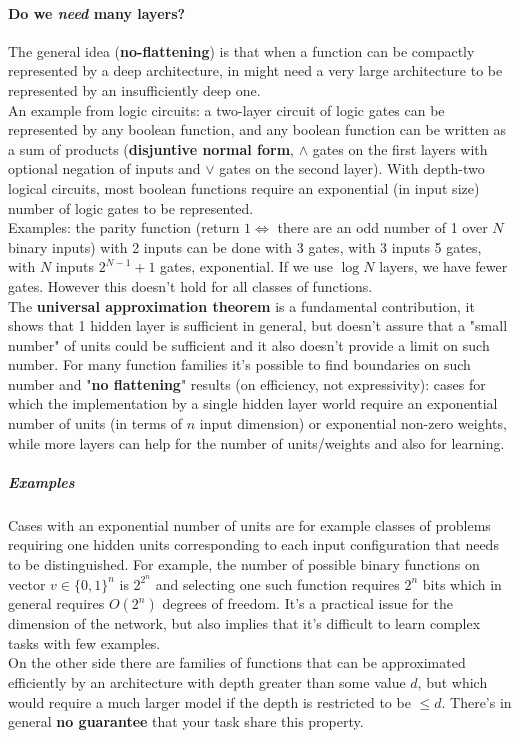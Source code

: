 \documentclass[10pt]{report}
\begin{document}
\paragraph{Do we \textit{need} many layers?} The general idea (\textbf{no-flattening}) is that when a function can be compactly represented by a deep architecture, in might need a very large architecture to be represented by an insufficiently deep one.\\
An example from logic circuits: a two-layer circuit of logic gates can be represented by any boolean function, and any boolean function can be written as a sum of products (\textbf{disjuntive normal form}, $\wedge$ gates on the first layers with optional negation of inputs and $\vee$ gates on the second layer). With depth-two logical circuits, most boolean functions require an exponential (in input size) number of logic gates to be represented.\\
Examples: the parity function (return $1\Leftrightarrow$ there are an odd number of 1 over $N$ binary inputs) with 2 inputs can be done with 3 gates, with 3 inputs 5 gates, with $N$ inputs $2^{N-1}+1$ gates, exponential. If we use $\log N$ layers, we have fewer gates. However this doesn't hold for all classes of functions.\\
The \textbf{universal approximation theorem} is a fundamental contribution, it shows that 1 hidden layer is sufficient in general, but doesn't assure that a "small number" of units could be sufficient and it also doesn't provide a limit on such number. For many function families it's possible to find boundaries on such number and "\textbf{no flattening}" results (on efficiency, not expressivity): cases for which the implementation by a single hidden layer world require an exponential number of units (in terms of $n$ input dimension) or exponential non-zero weights, while more layers can help for the number of units/weights and also for learning.
\subparagraph{Examples} Cases with an exponential number of units are for example classes of problems requiring one hidden units corresponding to each input configuration that needs to be distinguished. For example, the number of possible binary functions on vector $v\in\{0,1\}^n$ is $2^{2^n}$ and selecting one such function requires $2^n$ bits which in general requires $O(2^n)$ degrees of freedom. It's a practical issue for the dimension of the network, but also implies that it's difficult to learn complex tasks with few examples.\\
On the other side there are families of functions that can be approximated efficiently by an architecture with depth greater than some value $d$, but which would require a much larger model if the depth is restricted to be $\leq d$. There's in general \textbf{no guarantee} that your task share this property.
\end{document}
